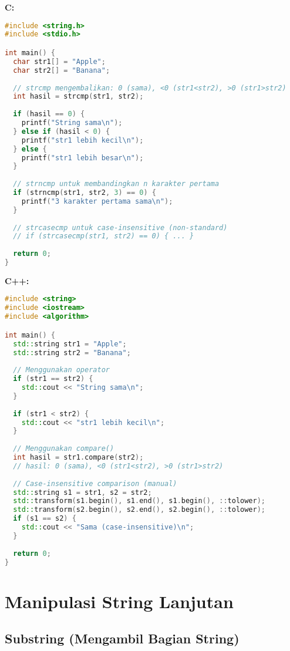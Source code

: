 \documentclass[../main.tex]{subfiles}
\begin{document}
\textbf{C:}
\begin{lstlisting}[language=C, caption={Perbandingan di C}]
#include <string.h>
#include <stdio.h>

int main() {
  char str1[] = "Apple";
  char str2[] = "Banana";
  
  // strcmp mengembalikan: 0 (sama), <0 (str1<str2), >0 (str1>str2)
  int hasil = strcmp(str1, str2);
  
  if (hasil == 0) {
    printf("String sama\n");
  } else if (hasil < 0) {
    printf("str1 lebih kecil\n");
  } else {
    printf("str1 lebih besar\n");
  }
  
  // strncmp untuk membandingkan n karakter pertama
  if (strncmp(str1, str2, 3) == 0) {
    printf("3 karakter pertama sama\n");
  }
  
  // strcasecmp untuk case-insensitive (non-standard)
  // if (strcasecmp(str1, str2) == 0) { ... }
  
  return 0;
}
\end{lstlisting}

\textbf{C++:}
\begin{lstlisting}[language=C++, caption={Perbandingan di C++}]
#include <string>
#include <iostream>
#include <algorithm>

int main() {
  std::string str1 = "Apple";
  std::string str2 = "Banana";
  
  // Menggunakan operator
  if (str1 == str2) {
    std::cout << "String sama\n";
  }
  
  if (str1 < str2) {
    std::cout << "str1 lebih kecil\n";
  }
  
  // Menggunakan compare()
  int hasil = str1.compare(str2);
  // hasil: 0 (sama), <0 (str1<str2), >0 (str1>str2)
  
  // Case-insensitive comparison (manual)
  std::string s1 = str1, s2 = str2;
  std::transform(s1.begin(), s1.end(), s1.begin(), ::tolower);
  std::transform(s2.begin(), s2.end(), s2.begin(), ::tolower);
  if (s1 == s2) {
    std::cout << "Sama (case-insensitive)\n";
  }
  
  return 0;
}
\end{lstlisting}

\section{Manipulasi String Lanjutan}

\subsection{Substring (Mengambil Bagian String)}
\end{document}
